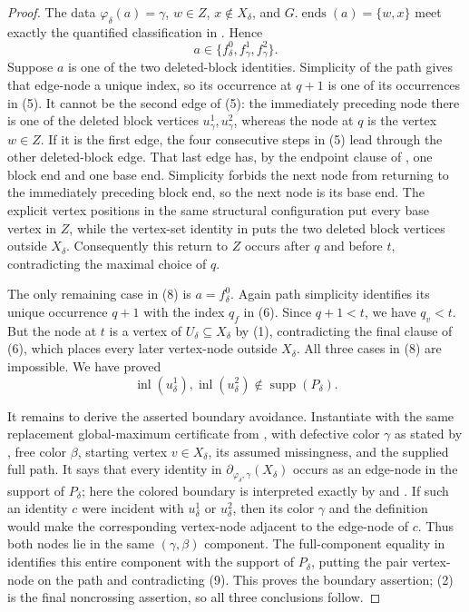 \begin{proof}
The data $\varphi_\delta(a)=\gamma$, $w\in Z$, $x\notin X_\delta$,
and $G.\operatorname{ends}(a)=\{w,x\}$ meet exactly the quantified
classification in
.  Hence
\[
             a\in\{f^0_\delta,f^1_\gamma,f^2_\gamma\}.        \tag{8}
\]
Suppose $a$ is one of the two deleted-block identities.  Simplicity of
the path gives that edge-node a unique index, so its occurrence at
$q+1$ is one of its occurrences in (5).  It cannot be the second edge
of (5): the immediately preceding node there is one of the deleted block
vertices $u^1_\gamma,u^2_\gamma$, whereas the node at $q$ is the vertex
$w\in Z$.  If it is the first edge, the four consecutive steps in (5)
lead through the other deleted-block edge.  That last edge has, by the
endpoint clause of , one block
end and one base end.  Simplicity forbids the next node from returning to
the immediately preceding block end, so the next node is its base end.
The explicit vertex positions in the same structural configuration put
every base vertex in $Z$, while the vertex-set identity in
 puts the two deleted block vertices
outside $X_\delta$.  Consequently this return to $Z$ occurs after $q$
and before $t$, contradicting the maximal choice of $q$.

The only remaining case in (8) is $a=f^0_\delta$.  Again path simplicity
identifies its unique occurrence $q+1$ with the index $q_f$ in (6).
Since $q+1<t$, we have $q_v< t$.  But the node at $t$ is a vertex of
$U_\delta\subseteq X_\delta$ by (1), contradicting the final clause of
(6), which places every later vertex-node outside $X_\delta$.  All three
cases in (8) are impossible.  We have proved
\[
       \operatorname{inl}(u^1_\delta),
       \operatorname{inl}(u^2_\delta)\notin\operatorname{supp}(P_\delta).
                                                                    \tag{9}
\]

It remains to derive the asserted boundary avoidance.  Instantiate
 with the same replacement
global-maximum certificate from ,
with defective color $\gamma$ as stated by
, free color
$\beta$, starting vertex $v\in X_\delta$, its assumed missingness, and
the supplied full path.  It says that every identity in
$\partial_{\varphi_\delta,\gamma}(X_\delta)$ occurs as an edge-node in
the support of $P_\delta$; here the colored boundary is interpreted
exactly by  and .
If such an identity $c$ were incident with $u^1_\delta$ or
$u^2_\delta$, then its color $\gamma$ and the definition
 would make the corresponding vertex-node
adjacent to the edge-node of $c$.  Thus both nodes lie in the same
$(\gamma,\beta)$ component.  The full-component equality in
 identifies this entire component with
the support of $P_\delta$, putting the pair vertex-node on the path and
contradicting (9).  This proves the boundary assertion; (2) is the final
noncrossing assertion, so all three conclusions follow.
\end{proof}
